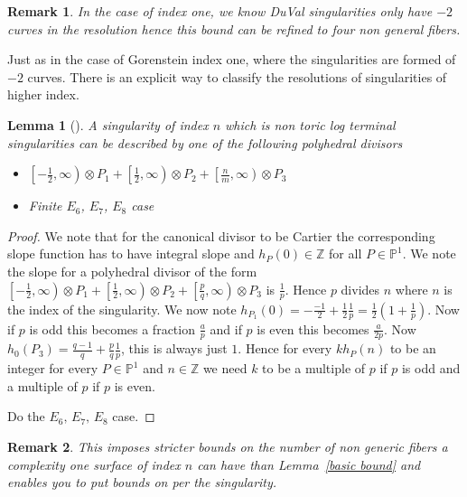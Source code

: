 \documentclass[11pt]{amsart}
\theoremstyle{plain}
\newtheorem{lem}[thm]{Lemma}
\newtheorem*{rem}{Remark}
\newcommand{\mb}[1]{\mathbb{#1}}
\begin{document}
\begin{rem}
In the case of index one, we know DuVal singularities only have $-2$ curves in the resolution hence this bound can be refined to four non general fibers.
\end{rem}

Just as in the case of Gorenstein index one, where the singularities are formed of $-2$ curves. There is an explicit way to classify the resolutions of singularities of higher index.

\begin{lem}[\label{basic bound}]
A singularity of index $n$ which is non toric log terminal singularities can be described by one of the following polyhedral divisors
\begin{itemize}
\item $\left[-\frac{1}{2}, \infty \right) \otimes P_1 + \left[ \frac{1}{2}, \infty \right) \otimes P_2 + \left[ \frac{n}{m}, \infty \right) \otimes P_3$

\item Finite $E_6$, $E_7$, $E_8$ case
\end{itemize}
\end{lem}

\begin{proof}
We note that for the canonical divisor to be Cartier the corresponding slope function has to have integral slope and $h_P(0) \in \mathbb{Z}$ for all $P \in \mb{P}^1$. We note the slope for a polyhedral divisor of the form $\left[-\frac{1}{2}, \infty \right) \otimes P_1 + \left[ \frac{1}{2}, \infty \right) \otimes P_2 + \left[ \frac{p}{q}, \infty \right) \otimes P_3$ is $\frac{1}{p}$. Hence $p$ divides $n$ where $n$ is the index of the singularity. We now note $h_{P_1} (0) = -\frac{-1}{2} + \frac{1}{2} \frac{1}{p} = \frac{1}{2} (1 + \frac{1}{p})$. Now if $p$ is odd this becomes a fraction $\frac{a}{p}$ and if $p$ is even this becomes $\frac{a}{2p}$. Now $h_0(P_3) = \frac{q-1}{q} + \frac{p}{q} \frac{1}{p}$, this is always just $1$. Hence for every $k h_P(n)$ to be an integer for every $P \in \mb{P}^1$ and $n \in \mb{Z}$ we need $k$ to be a multiple of $p$ if $p$ is odd and a multiple of $p$ if $p$ is even.


Do the $E_6, \, E_7,\, E_8$ case.
\end{proof}

\begin{rem}
This imposes stricter bounds on the number of non generic fibers a complexity one surface of index $n$ can have than Lemma~\ref{basic bound} and enables you to put bounds on per the singularity. 
\end{rem}
\end{document}
